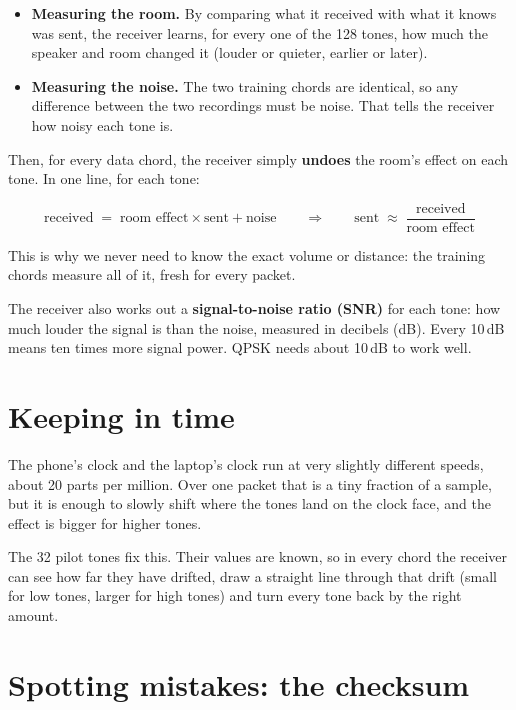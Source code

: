 \documentclass[12pt,a4paper]{article}
\begin{document}
\begin{itemize}
\item \textbf{Measuring the room.} By comparing what it received with what it
knows was sent, the receiver learns, for every one of the 128 tones, how much
the speaker and room changed it (louder or quieter, earlier or later).
\item \textbf{Measuring the noise.} The two training chords are identical, so any
difference between the two recordings must be noise. That tells the receiver
how noisy each tone is.
\end{itemize}

Then, for every data chord, the receiver simply \textbf{undoes} the room's effect
on each tone. In one line, for each tone:

\begin{idea}
\[
\text{received} \;=\; \text{room effect}\times\text{sent} + \text{noise}
\qquad\Longrightarrow\qquad
\text{sent} \;\approx\; \frac{\text{received}}{\text{room effect}}
\]
\end{idea}

This is why we never need to know the exact volume or distance: the training
chords measure all of it, fresh for every packet.

The receiver also works out a \textbf{signal-to-noise ratio (SNR)} for each tone:
how much louder the signal is than the noise, measured in decibels (dB). Every
10\,dB means ten times more signal power. QPSK needs about 10\,dB to work well.

\section{Keeping in time}
\label{sec:clock}

The phone's clock and the laptop's clock run at very slightly different
speeds, about 20 parts per million. Over one packet that is a tiny fraction of
a sample, but it is enough to slowly shift where the tones land on the clock
face, and the effect is bigger for higher tones.

The 32 pilot tones fix this. Their values are known, so in every chord the
receiver can see how far they have drifted, draw a straight line through that
drift (small for low tones, larger for high tones) and turn every tone back by
the right amount.

\section{Spotting mistakes: the checksum}
\label{sec:crc}
\end{document}
